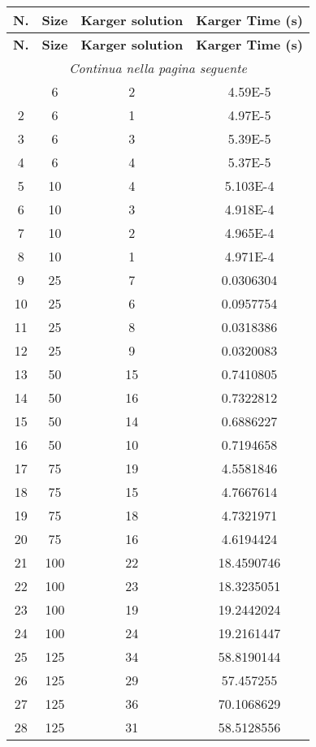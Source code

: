 \begin{center}
	\begin{longtable}{|c|c|c|c|}	
		\hline
		\textbf{N.} & \textbf{Size} & \textbf{Karger solution} & \textbf{Karger Time (s)}
		\endfirsthead
		\multicolumn{4}{|c|}{\tablename\ \thetable\ \ --\  \textit{continuazione dalla pagina precedente}} \\ \hline
		\textbf{N.} & \textbf{Size} & \textbf{Karger solution} & \textbf{Karger Time (s)} \\ \hline
		\endhead \hline 
		\multicolumn{4}{|c|}{\textit{Continua nella pagina seguente}} \\
		\endfoot  
		\endlastfoot
		\hline
		1 & 6 & 2 & 4.59E-5 \\
		2 & 6 & 1 & 4.97E-5 \\
		3 & 6 & 3 & 5.39E-5 \\
		4 & 6 & 4 & 5.37E-5 \\
		5 & 10 & 4 & 5.103E-4 \\
		6 & 10 & 3 & 4.918E-4 \\
		7 & 10 & 2 & 4.965E-4 \\
		8 & 10 & 1 & 4.971E-4 \\
		9 & 25 & 7 & 0.0306304 \\
		10 & 25 & 6 & 0.0957754 \\		
		11 & 25 & 8 & 0.0318386 \\		
		12 & 25 & 9 & 0.0320083 \\		
		13 & 50 & 15 & 0.7410805 \\		
		14 & 50 & 16 & 0.7322812 \\		
		15 & 50 & 14 & 0.6886227 \\		
		16 & 50 & 10 & 0.7194658 \\		 
		17 & 75 & 19 & 4.5581846 \\		
		18 & 75 & 15 & 4.7667614 \\		
		19 & 75 & 18 & 4.7321971 \\		
		20 & 75 & 16 & 4.6194424 \\		
		21 & 100 & 22 & 18.4590746 \\		
		22 & 100 & 23 & 18.3235051 \\		
		23 & 100 & 19 & 19.2442024 \\		
		24 & 100 & 24 & 19.2161447 \\		
		25 & 125 & 34 & 58.8190144 \\		
		26 & 125 & 29 & 57.457255 \\		
		27 & 125 & 36 & 70.1068629 \\		
		28 & 125 & 31 & 58.5128556 \\		

\end{longtable}
\end{center}

